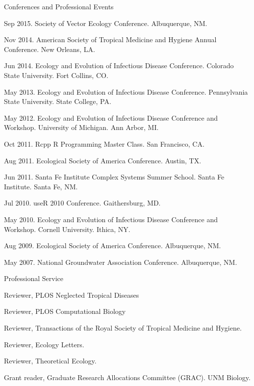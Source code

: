 \documentclass{resume} %
\begin{document}



\begin{rSection}{Conferences and Professional Events}
\item Sep 2015. Society of Vector Ecology Conference. Albuquerque, NM.
\item Nov 2014. American Society of Tropical Medicine and Hygiene Annual
Conference.  New Orleans, LA.
\item Jun 2014. Ecology and Evolution of Infectious Disease Conference.
Colorado State University.  Fort Collins, CO.
\item May 2013. Ecology and Evolution of Infectious Disease Conference.
Pennsylvania State University.  State College, PA.
\item May 2012. Ecology and Evolution of Infectious Disease Conference
and Workshop.  University of Michigan.  Ann Arbor, MI.
\item Oct 2011. Rcpp R Programming Master Class. San Francisco, CA.
\item Aug 2011. Ecological Society of America Conference. Austin, TX.
\item Jun 2011. Santa Fe Institute Complex Systems Summer School. Santa Fe Institute. Santa Fe, NM. 
\item Jul 2010.  useR 2010 Conference. Gaithersburg, MD. 
\item May 2010. Ecology and Evolution of Infectious Disease Conference
and Workshop.  Cornell University.  Ithica, NY.
\item Aug 2009. Ecological Society of America Conference. Albuquerque, NM.
\item May 2007. National Groundwater Association Conference. Albuquerque, NM. 
\end{rSection}

\begin{rSection}{Professional Service}
\item Reviewer, PLOS Neglected Tropical Diseases
\item Reviewer, PLOS Computational Biology
\item Reviewer, Transactions of the Royal Society of Tropical Medicine and Hygiene.
\item Reviewer, Ecology Letters.
\item Reviewer, Theoretical Ecology.
\item Grant reader, Graduate Research Allocations Committee (GRAC). UNM Biology.
\end{rSection}
\end{document}
